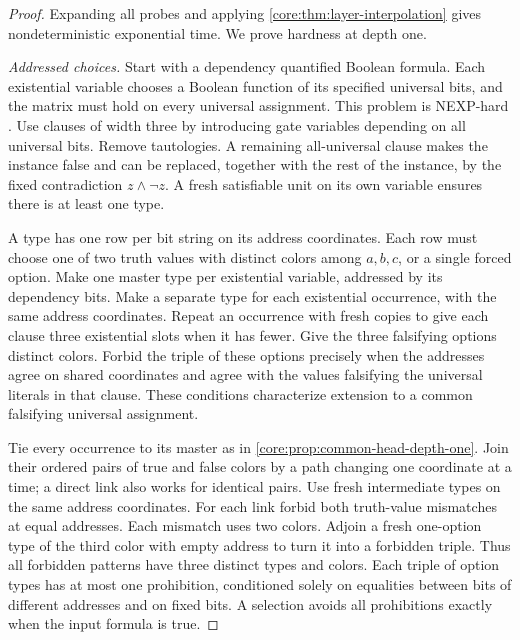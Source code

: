 \begin{proof}
Expanding all probes and applying \cref{core:thm:layer-interpolation}
gives nondeterministic exponential time. We prove hardness at depth one.

\emph{Addressed choices.}
Start with a dependency quantified Boolean formula. Each existential
variable chooses a Boolean function of its specified universal bits,
and the matrix must hold on every universal assignment. This problem
is NEXP-hard \cite{ChenHuangLuTan2022}. Use clauses of width three by
introducing gate variables depending on all universal bits. Remove
tautologies. A remaining all-universal clause makes the instance false
and can be replaced, together with the rest of the instance, by the
fixed contradiction $z\land\neg z$. A fresh satisfiable unit on its
own variable ensures there is at least one type.

A type has one row per bit string on its address coordinates. Each row
must choose one of two truth values with distinct colors among $a,b,c$,
or a single forced option. Make one master type per existential
variable, addressed by its dependency bits. Make a separate type for
each existential occurrence, with the same address coordinates. Repeat
an occurrence with fresh copies to give each clause three existential
slots when it has fewer. Give the three falsifying options distinct
colors. Forbid the triple of these options precisely when the addresses
agree on shared coordinates and agree with the values falsifying the
universal literals in that clause. These conditions characterize
extension to a common falsifying universal assignment.

Tie every occurrence to its master as in
\cref{core:prop:common-head-depth-one}. Join their ordered pairs of
true and false colors by a path changing one coordinate at a time;
a direct link also works for identical pairs. Use fresh intermediate
types on the same address coordinates. For each link forbid both
truth-value mismatches at equal addresses. Each mismatch uses two
colors. Adjoin a fresh one-option type of the third color with empty
address to turn it into a forbidden triple. Thus all forbidden patterns
have three distinct types and colors. Each triple of option types has
at most one prohibition, conditioned solely on equalities between
bits of different addresses and on fixed bits. A selection avoids all
prohibitions exactly when the input formula is true.


\end{proof}
